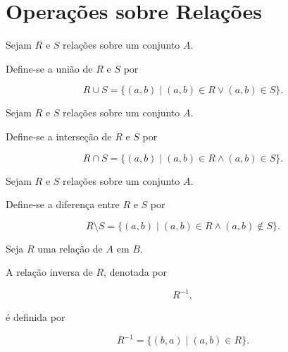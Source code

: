 \documentclass[../../main]{subfiles}
\begin{document}
\section{Operações sobre Relações}
\label{sec:matematica:relacoes:operacoes-sobre-relacoes}

\begin{defn}
	\label{def:matematica:relacoes:operacoes:uniao}

	Sejam \(R\) e \(S\) relações sobre um conjunto \(A\).

	Define-se a união de \(R\) e \(S\) por

	\[
		R \cup S
		=
		\{
		(a,b)
		\mid
		(a,b)\in R
		\lor
		(a,b)\in S
		\}.
	\]

\end{defn}

\begin{defn}
	\label{def:matematica:relacoes:operacoes:intersecao}

	Sejam \(R\) e \(S\) relações sobre um conjunto \(A\).

	Define-se a interseção de \(R\) e \(S\) por

	\[
		R \cap S
		=
		\{
		(a,b)
		\mid
		(a,b)\in R
		\land
		(a,b)\in S
		\}.
	\]

\end{defn}

\begin{defn}
	\label{def:matematica:relacoes:operacoes:diferenca}

	Sejam \(R\) e \(S\) relações sobre um conjunto \(A\).

	Define-se a diferença entre \(R\) e \(S\) por

	\[
		R \setminus S
		=
		\{
		(a,b)
		\mid
		(a,b)\in R
		\land
		(a,b)\notin S
		\}.
	\]

\end{defn}

\begin{defn}
	\label{def:matematica:relacoes:operacoes:inversa}

	Seja \(R\) uma relação de \(A\) em \(B\).

	A relação inversa de \(R\), denotada por

	\[
		R^{-1},
	\]

	é definida por

	\[
		R^{-1}
		=
		\{
		(b,a)
		\mid
		(a,b)\in R
		\}.
	\]

\end{defn}
\end{document}
